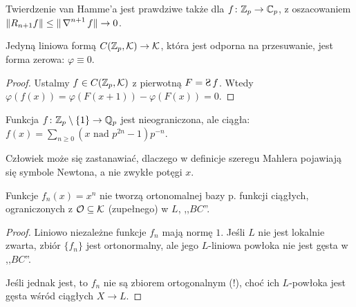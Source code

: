 \begin{wniosek}
	Twierdzenie van Hamme'a jest prawdziwe także dla $f \colon \mathbb Z_p \to \mathbb C_p$, z oszacowaniem $\|R_{n+1} f\| \le \|\operatorname{\nabla}^{n+1}f\| \to 0$.
\end{wniosek}


\begin{wniosek}\label{glorreichetraume}
	Jedyną liniowa formą $C(\mathbb Z_p, \mathcal K) \to \mathcal K$, która jest odporna na przesuwanie, jest forma zerowa: $\varphi \equiv 0$.
\end{wniosek}

\begin{proof}
	Ustalmy $f \in C(\mathbb Z_p, \mathcal K)$ z pierwotną $F = \suma f$.
	Wtedy $\varphi(f(x)) = \varphi(F(x+1)) - \varphi(F(x)) = 0$.
\end{proof}

\begin{przyklad}
	Funkcja $f \colon \mathbb Z_p \setminus \{1\} \to \mathbb Q_p$ jest nieograniczona, ale ciągła: $f(x) = \sum_{n \ge 0} (x \mbox{ nad } p^{2n}-1)p^{-n}$.
\end{przyklad}

Człowiek może się zastanawiać, dlaczego w definicje szeregu Mahlera pojawiają się symbole Newtona, a nie zwykłe potęgi $x$.

\begin{fakt}
	Funkcje $f_n(x) = x^n$ nie tworzą ortonomalnej bazy p. funkcji ciągłych, ograniczonych z $\mathcal O \subseteq \mathcal K$ (zupełnego) w $L$, ,,$BC$''.
\end{fakt}

\begin{proof}
	Liniowo niezależne funkcje $f_n$ mają normę $1$.
	Jeśli $L$ nie jest lokalnie zwarta, zbiór $\{f_n\}$  jest ortonormalny, ale jego $L$-liniowa powłoka nie jest gęsta w ,,$BC$''.
	
	Jeśli jednak jest, to $f_n$ nie są zbiorem ortogonalnym (!), choć ich $L$-powłoka jest gęsta wśród ciągłych $X \to L$.
\end{proof}
